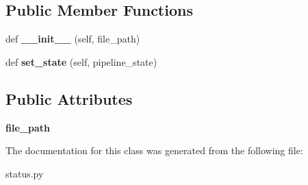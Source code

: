 \subsection*{Public Member Functions}
\begin{DoxyCompactItemize}
\item 
\mbox{\label{classcodar_1_1savanna_1_1status_1_1_workflow_status_a8e9bfa3627135919e28b501dde60241c}} 
def {\bfseries \+\_\+\+\_\+init\+\_\+\+\_\+} (self, file\+\_\+path)
\item 
\mbox{\label{classcodar_1_1savanna_1_1status_1_1_workflow_status_a66a2494ce4cb8605df72cf480e756e08}} 
def {\bfseries set\+\_\+state} (self, pipeline\+\_\+state)
\end{DoxyCompactItemize}
\subsection*{Public Attributes}
\begin{DoxyCompactItemize}
\item 
\mbox{\label{classcodar_1_1savanna_1_1status_1_1_workflow_status_ae4eb41515ae3ac77a11e1905835497e6}} 
{\bfseries file\+\_\+path}
\end{DoxyCompactItemize}


The documentation for this class was generated from the following file\+:\begin{DoxyCompactItemize}
\item 
status.\+py\end{DoxyCompactItemize}
